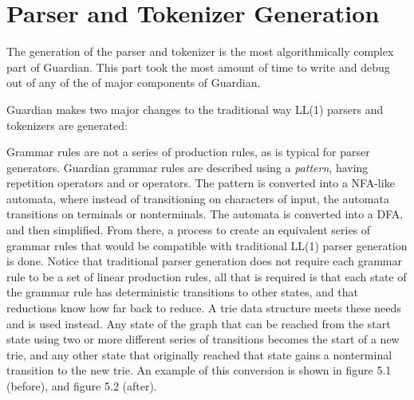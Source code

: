 
\section{Parser and Tokenizer Generation}
{
	The generation of the parser and tokenizer is the most
		algorithmically complex part of Guardian.
		This part took the most amount of time to write
		and debug out of any of the of major components of Guardian.
	
	Guardian makes two major changes to the traditional way LL(1) parsers
	and tokenizers are generated:
	
	\begin{enumerate}
	{
		\item Grammar rules are not a series of production rules, as is
			typical for parser generators. Guardian grammar rules are
			described using a \textit{pattern}, having repetition
			operators and or operators.
			The pattern is converted into a NFA-like automata, where instead
			of transitioning on characters of input, the automata transitions
			on terminals or nonterminals. The automata is converted into a
			DFA, and then simplified. From there, a process to create an
			equivalent series of grammar rules that would be compatible
			with traditional LL(1) parser generation is done. Notice
			that traditional parser generation does not require each grammar
			rule to be a set of linear production rules, all that is required
			is that each state of the grammar rule has
			deterministic transitions to other states,
			and that reductions know how far back to reduce.
			A trie data structure meets these needs and is used instead.
			Any state of the graph that can be reached from the start state
			using two or more different series of transitions becomes
			the start of a
			new trie,
			and any other state that originally reached that state gains a
			nonterminal transition to the new trie. An example of this
			conversion is shown in figure 5.1 (before), and figure 5.2 (after).
			
			\begin{figure}
				\begin{center}
\end{center}
\end{figure}}
\end{enumerate}}
